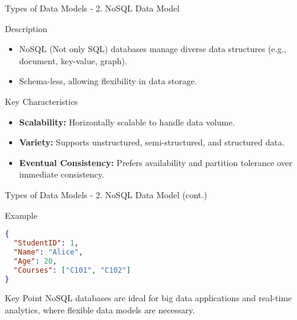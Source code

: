 \documentclass[aspectratio=169]{beamer}
\begin{document}
\begin{frame}[fragile]{Types of Data Models - 2. NoSQL Data Model}
    \begin{block}{Description}
        \begin{itemize}
            \item NoSQL (Not only SQL) databases manage diverse data structures (e.g., document, key-value, graph).
            \item Schema-less, allowing flexibility in data storage.
        \end{itemize}
    \end{block}
    
    \begin{block}{Key Characteristics}
        \begin{itemize}
            \item \textbf{Scalability:} Horizontally scalable to handle data volume.
            \item \textbf{Variety:} Supports unstructured, semi-structured, and structured data.
            \item \textbf{Eventual Consistency:} Prefers availability and partition tolerance over immediate consistency.
        \end{itemize}
    \end{block}
\end{frame}

\begin{frame}[fragile]{Types of Data Models - 2. NoSQL Data Model (cont.)}
    \begin{block}{Example}
        \begin{lstlisting}[language=json]
{
  "StudentID": 1,
  "Name": "Alice",
  "Age": 20,
  "Courses": ["C101", "C102"]
}
        \end{lstlisting}
    \end{block}

    \begin{block}{Key Point}
        NoSQL databases are ideal for big data applications and real-time analytics, where flexible data models are necessary.
    \end{block}
\end{frame}
\end{document}
